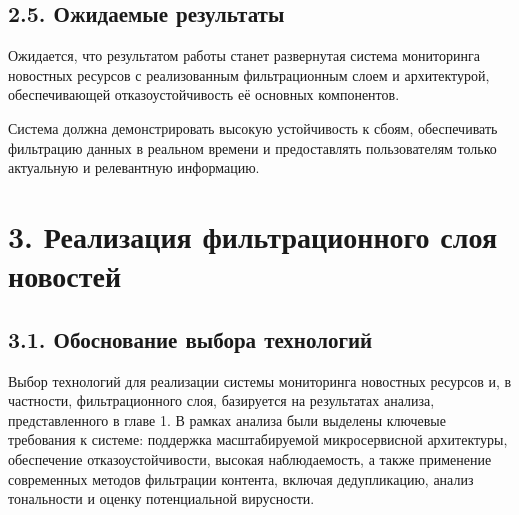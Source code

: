 \hypertarget{ux43eux436ux438ux434ux430ux435ux43cux44bux435-ux440ux435ux437ux443ux43bux44cux442ux430ux442ux44b}{%
\subsection{2.5. Ожидаемые
результаты}\label{ux43eux436ux438ux434ux430ux435ux43cux44bux435-ux440ux435ux437ux443ux43bux44cux442ux430ux442ux44b}}

Ожидается, что результатом работы станет развернутая система мониторинга
новостных ресурсов с реализованным фильтрационным слоем и архитектурой,
обеспечивающей отказоустойчивость её основных компонентов.

Система должна демонстрировать высокую устойчивость к сбоям,
обеспечивать фильтрацию данных в реальном времени и предоставлять
пользователям только актуальную и релевантную информацию.

\hypertarget{ux440ux435ux430ux43bux438ux437ux430ux446ux438ux44f-ux444ux438ux43bux44cux442ux440ux430ux446ux438ux43eux43dux43dux43eux433ux43e-ux441ux43bux43eux44f-ux43dux43eux432ux43eux441ux442ux435ux439}{%
\section{3. Реализация фильтрационного слоя
новостей}\label{ux440ux435ux430ux43bux438ux437ux430ux446ux438ux44f-ux444ux438ux43bux44cux442ux440ux430ux446ux438ux43eux43dux43dux43eux433ux43e-ux441ux43bux43eux44f-ux43dux43eux432ux43eux441ux442ux435ux439}}

\hypertarget{ux43eux431ux43eux441ux43dux43eux432ux430ux43dux438ux435-ux432ux44bux431ux43eux440ux430-ux442ux435ux445ux43dux43eux43bux43eux433ux438ux439}{%
\subsection{3.1. Обоснование выбора
технологий}\label{ux43eux431ux43eux441ux43dux43eux432ux430ux43dux438ux435-ux432ux44bux431ux43eux440ux430-ux442ux435ux445ux43dux43eux43bux43eux433ux438ux439}}

Выбор технологий для реализации системы мониторинга новостных ресурсов
и, в частности, фильтрационного слоя, базируется на результатах анализа,
представленного в главе 1. В рамках анализа были выделены ключевые
требования к системе: поддержка масштабируемой микросервисной
архитектуры, обеспечение отказоустойчивости, высокая наблюдаемость, а
также применение современных методов фильтрации контента, включая
дедупликацию, анализ тональности и оценку потенциальной вирусности.

